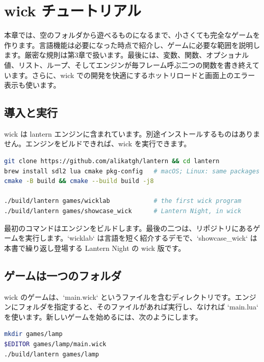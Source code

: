 \chapter{wick チュートリアル}

本章では、空のフォルダから遊べるものになるまで、小さくても完全なゲームを作ります。言語機能は必要になった時点で紹介し、ゲームに必要な範囲を説明します。厳密な規則は第3章で扱います。最後には、変数、関数、オプショナル値、リスト、ループ、そしてエンジンが毎フレーム呼ぶ二つの関数を書き終えています。さらに、wick での開発を快適にするホットリロードと画面上のエラー表示も使います。

\section{導入と実行}

wick は lantern エンジンに含まれています。別途インストールするものはありません。エンジンをビルドできれば、wick を実行できます。

\begin{lstlisting}[language=bash,basicstyle=\ttfamily\small,keywordstyle={}]
git clone https://github.com/alikatgh/lantern && cd lantern
brew install sdl2 lua cmake pkg-config   # macOS; Linux: same packages
cmake -B build && cmake --build build -j8

./build/lantern games/wicklab            # the first wick program
./build/lantern games/showcase_wick      # Lantern Night, in wick
\end{lstlisting}

\noindent
最初のコマンドはエンジンをビルドします。最後の二つは、リポジトリにあるゲームを実行します。`wicklab` は言語を短く紹介するデモで、`showcase_wick` は本書で繰り返し登場する Lantern Night の wick 版です。

\section{ゲームは一つのフォルダ}

wick のゲームは、`main.wick` というファイルを含むディレクトリです。エンジンにフォルダを指定すると、そのファイルがあれば実行し、なければ `main.lua` を使います。新しいゲームを始めるには、次のようにします。

\begin{lstlisting}[language=bash,basicstyle=\ttfamily\small,keywordstyle={}]
mkdir games/lamp
$EDITOR games/lamp/main.wick
./build/lantern games/lamp
\end{lstlisting}

